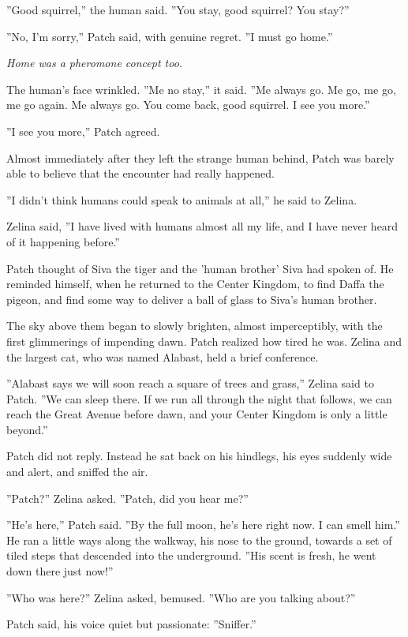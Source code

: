 \documentclass[11pt]{article}
\begin{document}
''Good squirrel,'' the human said. ''You stay, good squirrel? You stay?''\par
''No, I'm sorry,'' Patch said, with genuine regret. ''I must go home.''\par
{\it Home was a pheromone concept too.\par
The human's face wrinkled. ''Me no stay,'' it said. ''Me always go. Me go, me go, me go again. Me always go. You come back, good squirrel. I see you more.''\par
''I see you more,'' Patch agreed.\par
Almost immediately after they left the strange human behind, Patch was barely able to believe that the encounter had really happened.\par
''I didn't think humans could speak to animals at all,'' he said to Zelina.\par
Zelina said, ''I have lived with humans almost all my life, and I have never heard of it happening before.''\par
Patch thought of Siva the tiger and the 'human brother' Siva had spoken of. He reminded himself, when he returned to the Center Kingdom, to find Daffa the pigeon, and find some way to deliver a ball of glass to Siva's human brother.\par
The sky above them began to slowly brighten, almost imperceptibly, with the first glimmerings of impending dawn. Patch realized how tired he was. Zelina and the largest cat, who was named Alabast, held a brief conference.\par
''Alabast says we will soon reach a square of trees and grass,'' Zelina said to Patch. ''We can sleep there. If we run all through the night that follows, we can reach the Great Avenue before dawn, and your Center Kingdom is only a little beyond.''\par
Patch did not reply. Instead he sat back on his hindlegs, his eyes suddenly wide and alert, and sniffed the air.\par
''Patch?'' Zelina asked. ''Patch, did you hear me?''\par
''He's here,'' Patch said. ''By the full moon, he's here right now. I can smell him.'' He ran a little ways along the walkway, his nose to the ground, towards a set of tiled steps that descended into the underground. ''His scent is fresh, he went down there just now!''\par
''Who was here?'' Zelina asked, bemused. ''Who are you talking about?''\par
} Patch said, his voice quiet but passionate: ''Sniffer.''\par
\end{document}
